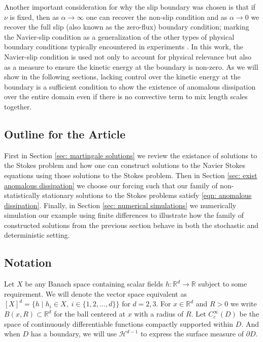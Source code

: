 \documentclass[11pt, reqno]{article}
\def\R{{\mathbb R}} %
\def\H{{\mathcal H}}
\begin{document}
Another important consideration for why the slip boundary was chosen is that if $\nu$ is fixed, then as $\alpha \to \infty$ one can recover the non-slip condition and as $\alpha \to 0$ we recover the full slip (also known as the zero-flux) boundary condition; marking the Navier-slip condition as a generalization of the other types of physical boundary conditions typically encountered in experiments \cite{chen2010study}. In this work, the Navier-slip condition is used not only to account for physical relevance but also as a measure to ensure the kinetic energy at the boundary is non-zero. As we will show in the following sections, lacking control over the kinetic energy at the boundary is a sufficient condition to show the existence of anomalous dissipation over the entire domain even if there is no convective term to mix length scales together. 

\subsection{Outline for the Article}
First in Section \ref{sec: martingale solutions} we review the existance of solutions to the Stokes problem and how one can construct solutions to the Navier Stokes equations using those solutions to the Stokes problem. Then in Section \ref{sec: exist anomalous dissipation} we choose our forcing such that our family of non-statistically stationary solutions to the Stokes problems satisfy \eqref{eqn: anomalous dissipation}. Finally, in Section \ref{sec: numerical simulations} we numerically simulation our example using finite differences to illustrate how the family of constructed solutions from the previous section behave in both the stochastic and deterministic setting.  

\subsection{Notation}
Let $X$ be any Banach space containing scalar fields $h:\R^d \to \R$ subject to some requirement. We will denote the vector space equivalent as $[X]^d = \{h \mid h_i \in X, \; i \in \{1,2,\dots, d \}\}$ for $d = 2,3$. For $x \in \R^d$ and $R > 0$ we write $B(x,R) \subset \R^d$ for the ball centered at $x$ with a radius of $R$. Let $C_c^\infty(D)$ be the space of continuously differentiable functions compactly supported within $D$. And when $D$ has a boundary, we will use $\H^{d-1}$ to express the surface measure of $\partial D$.
\end{document}
